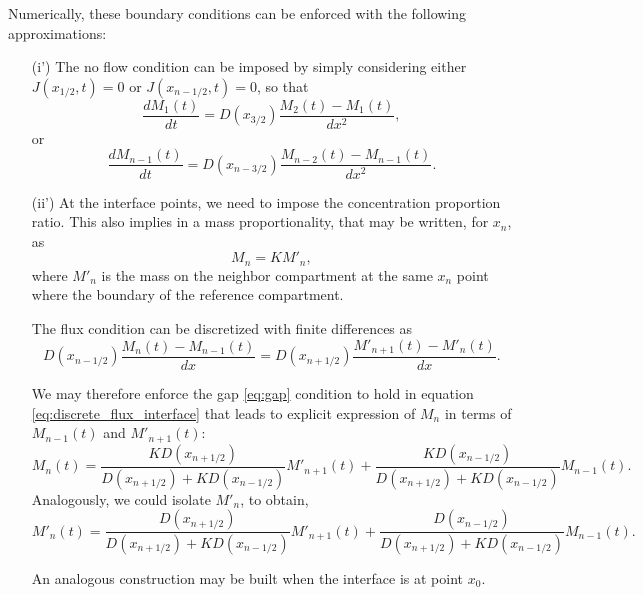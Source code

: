 \documentclass[final,1p,times]{elsarticle}
\begin{document}
Numerically, these boundary conditions can be enforced with the following approximations:
\begin{enumerate}
\item[(i')] The no flow condition can be imposed by simply considering either $J(x_{1/2},t)=0$ or $J(x_{n-1/2},t)=0$, so that
\begin{equation}
\frac{d M_{1}(t)}{dt}= D(x_{3/2})\frac{M_{2}(t)-M_{1}(t) }{dx^2},
\end{equation}
or
\begin{equation}
\frac{d M_{n-1}(t)}{dt}= D(x_{n-3/2})\frac{M_{n-2}(t)-M_{n-1}(t) }{dx^2}.
\end{equation}

\item[(ii')] 
At the interface points, we need to impose the concentration proportion ratio. This also implies in a mass proportionality, that may be written, for $x_n$, as
\begin{equation}
M_{n}=K M'_{n},
\label{eq:gap}
\end{equation}
where $M'_{n}$ is the mass on the neighbor compartment at the same $x_n$ point where the boundary of the reference compartment.

The flux condition can be discretized with finite differences as
\begin{equation}
 D(x_{n-1/2})\frac{M_{n}(t)-M_{n-1}(t) }{dx}= D(x_{n+1/2})\frac{M'_{n+1}(t)-M'_{n}(t) }{dx}.
 \label{eq:discrete_flux_interface}
\end{equation}

We may therefore enforce the gap \eqref{eq:gap} condition to hold in equation \eqref{eq:discrete_flux_interface} that leads to explicit expression of $M_{n}$ in terms of $M_{n-1}(t)$ and $M'_{n+1}(t)$:
\begin{equation}
M_{n}(t) = \frac{ KD(x_{n+1/2})}{D(x_{n+1/2})+KD(x_{n-1/2})} M'_{n+1}(t)+\frac{ KD(x_{n-1/2})}{D(x_{n+1/2})+KD(x_{n-1/2})} M_{n-1}(t).
\label{eq:gap+discrete_flux_interface}
\end{equation}
Analogously, we could isolate $M'_n$, to obtain, 
\begin{equation}
M'_{n}(t) = \frac{ D(x_{n+1/2})}{D(x_{n+1/2})+KD(x_{n-1/2})} M'_{n+1}(t)+\frac{ D(x_{n-1/2})}{D(x_{n+1/2})+KD(x_{n-1/2})} M_{n-1}(t).
\end{equation}


An analogous construction may be built when the interface is at point $x_0$.
\end{enumerate}
\end{document}
